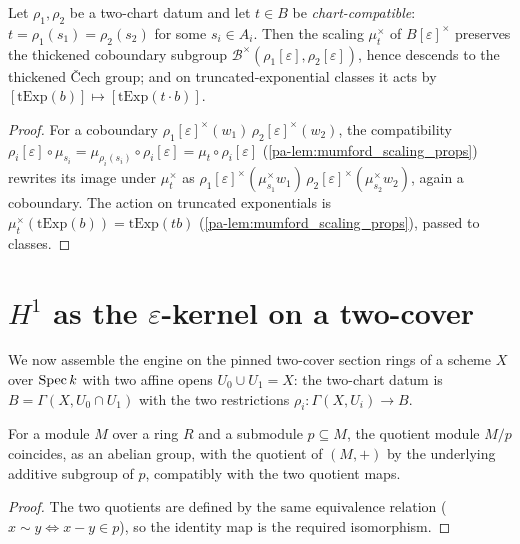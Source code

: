 \begin{lemma}
  \label{pa-lem:cech_scaling_equivariance}
  \leanok

  Let \(\rho_1, \rho_2\) be a two-chart datum and let \(t \in B\) be
  \emph{chart-compatible}: \(t = \rho_1(s_1) = \rho_2(s_2)\) for some \(s_i \in A_i\).
  Then the scaling \(\mu_t^\times\) of \(B[\varepsilon]^\times\) preserves the
  thickened coboundary subgroup \(\mathcal B^\times(\rho_1[\varepsilon],
  \rho_2[\varepsilon])\), hence descends to the thickened \v{C}ech group; and on
  truncated-exponential classes it acts by
  \([\mathrm{tExp}(b)] \mapsto [\mathrm{tExp}(t \cdot b)]\).
\end{lemma}
\begin{proof}
  \leanok
  For a coboundary \(\rho_1[\varepsilon]^\times(w_1)\,\rho_2[\varepsilon]^\times(w_2)\),
  the compatibility \(\rho_i[\varepsilon] \circ \mu_{s_i} = \mu_{\rho_i(s_i)} \circ
  \rho_i[\varepsilon] = \mu_t \circ \rho_i[\varepsilon]\)
  (\ref{pa-lem:mumford_scaling_props}) rewrites its image under \(\mu_t^\times\) as
  \(\rho_1[\varepsilon]^\times(\mu_{s_1}^\times w_1)\,
  \rho_2[\varepsilon]^\times(\mu_{s_2}^\times w_2)\), again a coboundary. The action on
  truncated exponentials is \(\mu_t^\times(\mathrm{tExp}(b)) = \mathrm{tExp}(t b)\)
  (\ref{pa-lem:mumford_scaling_props}), passed to classes.
\end{proof}

\section{\texorpdfstring{\(H^1\)}{H1} as the
  \texorpdfstring{\(\varepsilon\)}{epsilon}-kernel on a two-cover}

We now assemble the engine on the pinned two-cover section rings of a scheme \(X\) over
\(\operatorname{Spec} k\) with two affine opens \(U_0 \cup U_1 = X\): the two-chart datum
is \(B = \Gamma(X, U_0 \cap U_1)\) with the two restrictions
\(\rho_i : \Gamma(X, U_i) \to B\).

\begin{lemma}
  \label{pa-lem:submodule_quotient_addEquiv}
  \leanok

  For a module \(M\) over a ring \(R\) and a submodule \(p \subseteq M\), the quotient
  module \(M/p\) coincides, as an abelian group, with the quotient of \((M, +)\) by the
  underlying additive subgroup of \(p\), compatibly with the two quotient maps.
\end{lemma}
\begin{proof}
  \leanok
  The two quotients are defined by the same equivalence relation
  (\(x \sim y \iff x - y \in p\)), so the identity map is the required isomorphism.
\end{proof}

